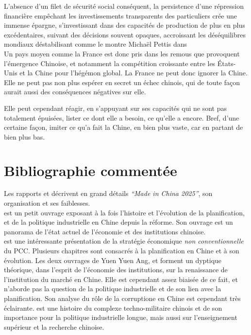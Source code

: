 \documentclass[a4paper]{article}
\begin{document}
 L’absence d’un filet de sécurité social conséquent, la persistence d’une
répression financière empêchant les investissements transparents des
particuliers crée une immense épargne, s’investissant dans des capacités de
production de plus en plus excédentaires, suivant des décisions souvent opaques,
accroissant les déséquilibres mondiaux déstabilisant comme le montre Michaël
Pettis dans \cite{klein20_trade} \\

Un pays moyen comme la France est donc pris dans les remous que provoquent
l’émergence Chinoise, et notamment la compétition croissante entre les
États-Unis et la Chine pour l’hégémon global. La France ne peut donc ignorer la
Chine. Elle ne peut pas non plus espérer en secret un échec chinois, qui de
toute façon aurait aussi des conséquences négatives sur elle.

Elle peut cependant réagir, en s’appuyant sur ses capacités qui ne sont pas
totalement épuisées, lister ce dont elle a besoin, ce qu’elle a encore. Bref,
d’une certaine façon, imiter ce qu’a fait la Chine, en bien plus vaste, car en
partant de bien plus bas.


\section{Bibliographie commentée}
\label{sec:orgc4508dc}

Les rapports \cite{Made_In_China_2025} et \cite{Evolving_MiC25} décrivent en grand
détails \emph{“Made in China 2025”}, son organisation et ses faiblesses.\\
\cite{naughton21_rise} est un petit ouvrage exposant à la fois l’histoire et
l’évolution de la planification, et de la politique industrielle en Chine depuis
la réforme. Son ouvrage \cite{naughton18_chines} est un panorama de l’état actuel
de l’économie et des institutions chinoise.\\

 \cite{heilmann18_red} est une intéressante présentation de la stratégie
économique \emph{non conventionnelle} du PCC. Plusieurs chapitres sont consacrés à la
planification en Chine et à son évolution. Les deux ouvrages de Yuen Yuen Ang,
\cite{ang20_chinas} et \cite{ang16_how_china} forment un dyptique théorique, dans
l’esprit de l’économie des institutions, sur la renaissance de l’institution du
marché en Chine. Elle est cependant assez biaisée de ce fait, et n’aborde pas la
question de la politique industrielle et de son lien avec la planification. Son
analyse du rôle de la corruptione en Chine est cependant très éclairante.
\cite{feigenbaum03_chinas} est une histoire du complexe techno-militaire chinois
et de son importance pour la politique industrielle longue, mais aussi sur
l’enseignement supérieur et la recherche chinoise.\\
\end{document}
